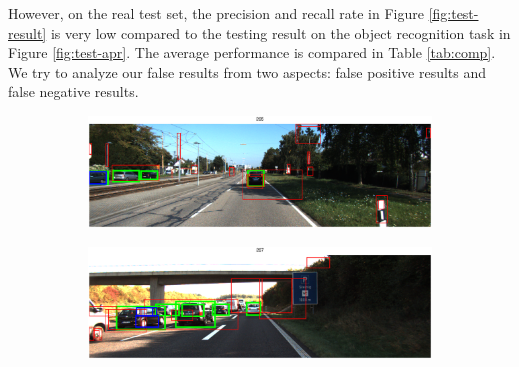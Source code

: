 \documentclass{article} %
\begin{document}
However, on the real test set, the precision and recall rate in Figure \ref{fig:test-result} is very low compared to the testing result on the object recognition task in Figure \ref{fig:test-apr}. The average performance is compared in Table \ref{tab:comp}. We try to analyze our false results from two aspects: false positive results and false negative results.

\begin{figure}[htb]
\begin{subfigure}[b]{0.5\textwidth}
    \includegraphics[width=.9\textwidth]{test-fp1.eps}
    \label{fig:test-fp1}
\end{subfigure}
\begin{subfigure}[b]{0.5\textwidth}
    \includegraphics[width=.9\textwidth]{test-fp2.eps}
    \label{fig:test-fp2}
\end{subfigure}


\end{figure}
\end{document}

